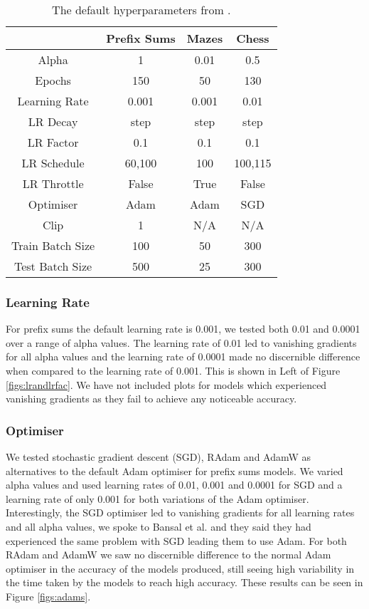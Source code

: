 \begin{table}[h]
\centering
\begin{tabular}{ |c|c|c|c| } 
 \hline
 & Prefix Sums & Mazes & Chess \\\hline
 Alpha & 1 & 0.01 & 0.5 \\ \hline
 Epochs & 150 & 50 & 130 \\\hline
 Learning Rate & 0.001 & 0.001 & 0.01 \\\hline
 LR Decay & step & step & step \\\hline
 LR Factor & 0.1 & 0.1 & 0.1 \\\hline
 LR Schedule & 60,100 & 100 & 100,115 \\\hline
 LR Throttle & False & True & False \\\hline
 Optimiser & Adam & Adam & SGD \\\hline
 Clip & 1 & N/A & N/A \\\hline
 Train Batch Size & 100 & 50 & 300 \\\hline
 Test Batch Size & 500 & 25 & 300 \\\hline
\end{tabular}
\caption{The default hyperparameters from \cite{bansal2022endtoend}.}
\label{table:hyperparams}
\end{table}

\subsubsection{Learning Rate}
For prefix sums the default learning rate is 0.001, we tested both 0.01 and 0.0001 over a range of alpha values. The learning rate of 0.01 led to vanishing gradients for all alpha values and the learning rate of 0.0001 made no discernible difference when compared to the learning rate of 0.001. This is shown in Left of Figure \ref{figs:lrandlrfac}. We have not included plots for models which experienced vanishing gradients as they fail to achieve any noticeable accuracy.

\subsubsection{Optimiser}
We tested stochastic gradient descent (SGD), RAdam \cite{RAdam} and AdamW \cite{AdamW} as alternatives to the default Adam optimiser for prefix sums models. We varied alpha values and used learning rates of 0.01, 0.001 and 0.0001 for SGD and a learning rate of only 0.001 for both variations of the Adam optimiser. Interestingly, the SGD optimiser led to vanishing gradients for all learning rates and all alpha values, we spoke to Bansal et al. and they said they had experienced the same problem with SGD leading them to use Adam. For both RAdam and AdamW we saw no discernible difference to the normal Adam optimiser in the accuracy of the models produced, still seeing high variability in the time taken by the models to reach high accuracy. These results can be seen in Figure \ref{figs:adams}.

